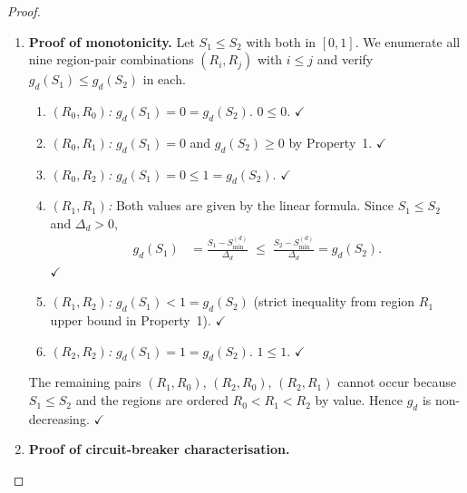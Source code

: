\documentclass[12pt,openany]{book}
\numberwithin{equation}{chapter}
\theoremstyle{plain}
\theoremstyle{definition}
\theoremstyle{remark}
\def\mathcal#1{#1}%
\begin{document}
\begin{proof}
\begin{enumerate}
\item \textbf{Proof of monotonicity.}
Let $\mathcal{S}_1 \leq \mathcal{S}_2$ with both in $[0,1]$.
We enumerate all nine region-pair combinations
$(R_i, R_j)$ with $i \leq j$ and verify
$g_d(\mathcal{S}_1) \leq g_d(\mathcal{S}_2)$ in each.
\begin{enumerate}
  \item \emph{$(R_0, R_0)$:}
        $g_d(\mathcal{S}_1) = 0 = g_d(\mathcal{S}_2)$.
        $0 \leq 0$. \hfill$\checkmark$
  \item \emph{$(R_0, R_1)$:}
        $g_d(\mathcal{S}_1) = 0$ and
        $g_d(\mathcal{S}_2) \geq 0$ by Property~1.
        \hfill$\checkmark$
  \item \emph{$(R_0, R_2)$:}
        $g_d(\mathcal{S}_1) = 0 \leq 1 = g_d(\mathcal{S}_2)$.
        \hfill$\checkmark$
  \item \emph{$(R_1, R_1)$:}
        Both values are given by the linear formula. Since
        $\mathcal{S}_1 \leq \mathcal{S}_2$ and $\Delta_d > 0$,
        \begin{align*}
          g_d(\mathcal{S}_1)
          &= \frac{\mathcal{S}_1 - \mathcal{S}_{\min}^{(d)}}{\Delta_d}
          \;\leq\;
          \frac{\mathcal{S}_2 - \mathcal{S}_{\min}^{(d)}}{\Delta_d}
          = g_d(\mathcal{S}_2).
        \end{align*}
        \hfill$\checkmark$
  \item \emph{$(R_1, R_2)$:}
        $g_d(\mathcal{S}_1) < 1 = g_d(\mathcal{S}_2)$
        (strict inequality from region $R_1$ upper bound in
        Property~1). \hfill$\checkmark$
  \item \emph{$(R_2, R_2)$:}
        $g_d(\mathcal{S}_1) = 1 = g_d(\mathcal{S}_2)$.
        $1 \leq 1$. \hfill$\checkmark$
\end{enumerate}
The remaining pairs $(R_1,R_0)$, $(R_2,R_0)$, $(R_2,R_1)$ cannot
occur because $\mathcal{S}_1 \leq \mathcal{S}_2$ and the regions
are ordered $R_0 < R_1 < R_2$ by value.
Hence $g_d$ is non-decreasing. \hfill$\checkmark$

\item \textbf{Proof of circuit-breaker characterisation.}


\end{enumerate}
\end{proof}
\end{document}
